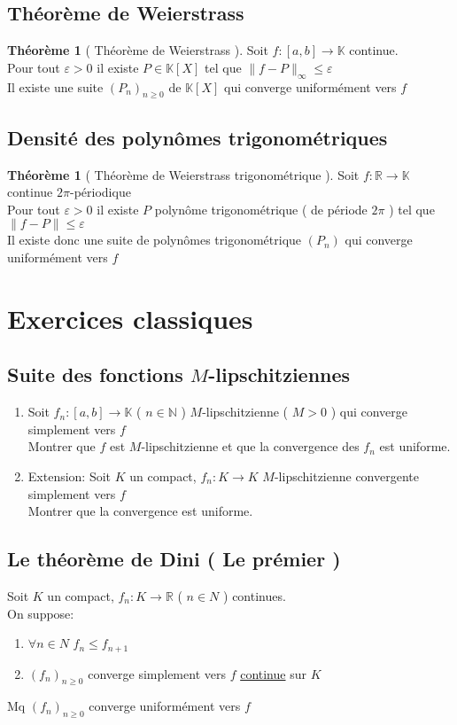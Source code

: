 \documentclass[10pt,a4paper]{article}
\theoremstyle{definition}
\newtheorem{theorem}[proposition]{Théorème}
\begin{document}
\subsection{Théorème de Weierstrass}
\begin{theorem}[ Théorème de Weierstrass ]
    Soit $f: [a, b] \to \mathbb{K}$ continue. \\
    Pour tout $\varepsilon > 0$ il existe $P \in \mathbb{K}[X]$ tel que $\lVert f - P \rVert_\infty \leq \varepsilon$ \\
    Il existe une suite $(P_n)_{n \geq 0}$ de $\mathbb{K}[X]$ qui converge uniformément vers $f$
\end{theorem}

\subsection{Densité des polynômes trigonométriques}
\begin{theorem}[ Théorème de Weierstrass trigonométrique ]
    Soit $f: \mathbb{R} \to \mathbb{K}$ continue $2\pi$-périodique \\
    Pour tout $\varepsilon > 0$ il existe $P$ polynôme trigonométrique ( de période $2\pi$ ) tel que $\lVert f - P \rVert \leq \varepsilon$ \\
    Il existe donc une suite de polynômes trigonométrique $(P_n)$ qui converge uniformément vers $f$
\end{theorem}

\section{Exercices classiques}
\subsection{Suite des fonctions $M$-lipschitziennes}
\begin{enumerate}
    \item Soit $f_n: [a, b] \to \mathbb{K}$ ( $n \in \mathbb{N}$ ) $M$-lipschitzienne ( $M > 0$ ) qui converge simplement vers $f$ \\
    Montrer que $f$ est $M$-lipschitzienne et que la convergence des $f_n$ est uniforme.
    \item Extension: Soit $K$ un compact, $f_n: K \to K$ $M$-lipschitzienne convergente simplement vers $f$ \\
    Montrer que la convergence est uniforme.
\end{enumerate}

\subsection{Le théorème de Dini ( Le prémier )}
Soit $K$ un compact, $f_n: K \to \mathbb{R}$ ( $n \in N$ ) continues. \\
On suppose:
\begin{enumerate}
    \item $\forall n \in N$ $f_n \leq f_{n + 1}$
    \item $(f_n)_{n \geq 0}$ converge simplement vers $f$ \uline{continue} sur $K$
\end{enumerate}
Mq $(f_n)_{n \geq 0}$ converge uniformément vers $f$
\end{document}
